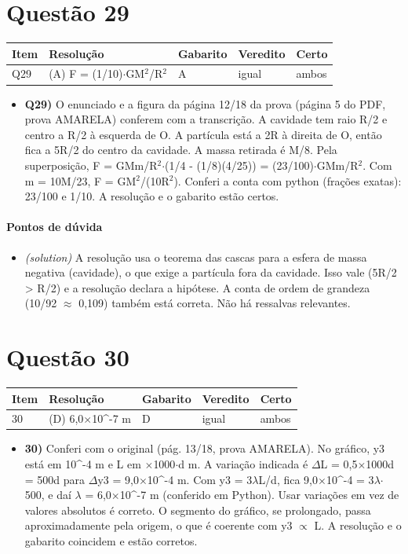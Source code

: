 \documentclass{article}%
\begin{document}
\section*{Questão 29}%
\begin{longtable}{@{}p{} p{} p{} p{} p{}@{}}\toprule Item & Resolução & Gabarito & Veredito & Certo \\ \midrule
Q29 & (A) F = (1/10)$\cdot$GM$^2$/R$^2$ & A & igual & ambos \\
\bottomrule\end{longtable}%
\begin{itemize}%
\item%
\textbf{Q29)} O enunciado e a figura da página 12/18 da prova (página 5 do PDF, prova AMARELA) conferem com a transcrição. A cavidade tem raio R/2 e centro a R/2 à esquerda de O. A partícula está a 2R à direita de O, então fica a 5R/2 do centro da cavidade. A massa retirada é M/8. Pela superposição, F = GMm/R$^2$$\cdot$(1/4 - (1/8)(4/25)) = (23/100)$\cdot$GMm/R$^2$. Com m = 10M/23, F = GM$^2$/(10R$^2$). Conferi a conta com python (frações exatas): 23/100 e 1/10. A resolução e o gabarito estão certos.%
\end{itemize}%
\paragraph{Pontos de dúvida}%
\begin{itemize}%
\item%
\textit{(solution)} A resolução usa o teorema das cascas para a esfera de massa negativa (cavidade), o que exige a partícula fora da cavidade. Isso vale (5R/2 > R/2) e a resolução declara a hipótese. A conta de ordem de grandeza (10/92 $\approx$ 0,109) também está correta. Não há ressalvas relevantes.%
\end{itemize}%
\section*{Questão 30}%
\begin{longtable}{@{}p{} p{} p{} p{} p{}@{}}\toprule Item & Resolução & Gabarito & Veredito & Certo \\ \midrule
30 & (D) 6,0$\times$10\^{}{-}7 m & D & igual & ambos \\
\bottomrule\end{longtable}%
\begin{itemize}%
\item%
\textbf{30)} Conferi com o original (pág. 13/18, prova AMARELA). No gráfico, y3 está em 10\^{}{-}4 m e L em $\times$1000$\cdot$d m. A variação indicada é $\Delta$L = 0,5$\times$1000d = 500d para $\Delta$y3 = 9,0$\times$10\^{}{-}4 m. Com y3 = 3$\lambda$L/d, fica 9,0$\times$10\^{}{-}4 = 3$\lambda$$\cdot$500, e daí $\lambda$ = 6,0$\times$10\^{}{-}7 m (conferido em Python). Usar variações em vez de valores absolutos é correto. O segmento do gráfico, se prolongado, passa aproximadamente pela origem, o que é coerente com y3 $\propto$ L. A resolução e o gabarito coincidem e estão corretos.%
\end{itemize}%
\end{document}
